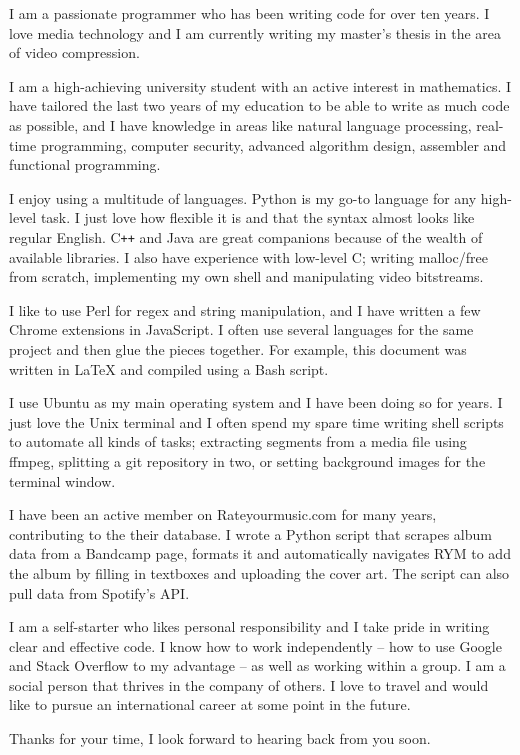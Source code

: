 I am a passionate programmer who has been writing code for over ten years. I love media technology and I am currently writing my master's thesis in the area of video compression.

I am a high-achieving university student with an active interest in mathematics. I have tailored the last two years of my education to be able to write as much code as possible, and I have knowledge in areas like natural language processing, real-time programming, computer security, advanced algorithm design, assembler and functional programming.

I enjoy using a multitude of languages. Python is my go-to language for any high-level task. I just love how flexible it is and that the syntax almost looks like regular English. C\texttt{++} and Java are great companions because of the wealth of available libraries. I also have experience with low-level C; writing malloc/free from scratch, implementing my own shell and manipulating video bitstreams.

I like to use Perl for regex and string manipulation, and I have written a few Chrome extensions in JavaScript. I often use several languages for the same project and then glue the pieces together. For example, this document was written in LaTeX and compiled using a Bash script.

I use Ubuntu as my main operating system and I have been doing so for years. I just love the Unix terminal and I often spend my spare time writing shell scripts to automate all kinds of tasks; extracting segments from a media file using ffmpeg, splitting a git repository in two, or setting background images for the terminal window.

I have been an active member on Rateyourmusic.com for many years, contributing to the their database. I wrote a Python script that scrapes album data from a Bandcamp page, formats it and automatically navigates RYM to add the album by filling in textboxes and uploading the cover art. The script can also pull data from Spotify's API.

I am a self-starter who likes personal responsibility and I take pride in writing clear and effective code. I know how to work independently – how to use Google and Stack Overflow to my advantage – as well as working within a group. I am a social person that thrives in the company of others. I love to travel and would like to pursue an international career at some point in the future.

Thanks for your time, I look forward to hearing back from you soon.